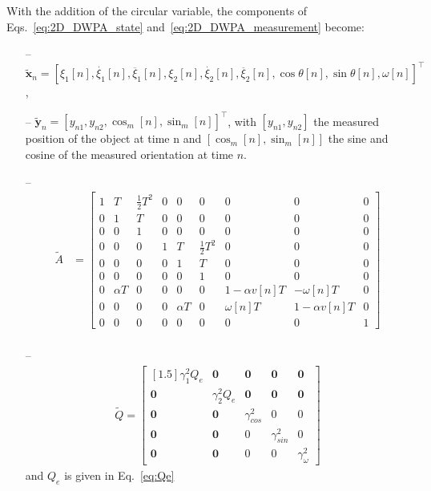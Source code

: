 \documentclass[fleqn,12pt]{article}
\begin{document}
With the addition of the circular variable, the components of
Eqs.~\ref{eq:2D_DWPA_state}
and~\ref{eq:2D_DWPA_measurement} become:

\begin{itemize}

    \item[--]
        $\tilde{\mathbf{x}}_n=\left[\xi_1[n],\dot{\xi_1}[n],\ddot{\xi_1}[n],\xi_2[n],\dot{\xi_2}[n],\ddot{\xi_2}[n],\cos\theta[n],\sin\theta[n],\omega[n]\right]^\intercal$,

    \item[--] $\tilde{\mathbf{y}}_n=[y_{n1},y_{n2},
        \cos_m[n],\sin_m[n]]^\intercal$, with $[y_{n1},y_{n2}]$ the
        measured position of the object at time n and $[\cos_m[n],\sin_m[n]]$
        the sine and cosine of the measured orientation at time $n$.

    \item[--]
        \begin{align*}
            \tilde{A}&=\begin{bmatrix}
                1 & T & \frac{1}{2}T^2 & 0 & 0 & 0& 0 & 0 & 0\\
                0 & 1 & T & 0 & 0 & 0& 0 & 0 & 0\\
                0 & 0 & 1 & 0 & 0 & 0& 0 & 0 & 0\\
                0 & 0 & 0 & 1 & T & \frac{1}{2}T^2 & 0 & 0 & 0\\
                0 & 0 & 0 & 0 & 1 & T & 0 & 0 & 0\\
                0 & 0 & 0 & 0 & 0 & 1 & 0 & 0 & 0\\
                0 & \alpha T & 0 & 0 & 0 & 0 & 1-\alpha v[n]T & -\omega[n]T & 0\\
                0 & 0 & 0 & 0 & \alpha T & 0 & \omega[n]T & 1-\alpha v[n]T & 0\\
                0 & 0 & 0 & 0 & 0 & 0 & 0 & 0 & 1
            \end{bmatrix}\nonumber\\
        \end{align*}

    \item[--]
        \begin{align*}
            \tilde{Q}=\begin{bmatrix}[1.5]
                \gamma^2_1Q_e & \mathbf{0} & \mathbf{0} & \mathbf{0} & \mathbf{0}\\
                \mathbf{0} & \gamma^2_2Q_e & \mathbf{0} & \mathbf{0} & \mathbf{0}\\
                \mathbf{0} & \mathbf{0} & \gamma^2_{cos} & 0 & 0\\
                \mathbf{0} & \mathbf{0} & 0 & \gamma^2_{sin} & 0\\
                \mathbf{0} & \mathbf{0} & 0 & 0 & \gamma^2_\omega
            \end{bmatrix}
        \end{align*}
        and $Q_e$ is given in Eq.~\ref{eq:Qe}


\end{itemize}
\end{document}
